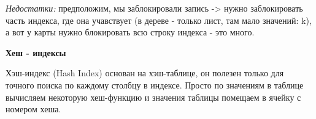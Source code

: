 \textit{Недостатки:} предположим, мы заблокировали запись -> нужно заблокировать часть индекса, где она учавствует (в дереве - только лист, там мало значений: k), а вот у карты нужно блокировать всю строку индекса - это много.


\textbf{Хеш - индексы} 

Хэш-индекс (Hash Index) основан на хэш-таблице, он полезен только для точного поиска по каждому столбцу в индексе. Просто по значениям в таблице вычисляем некоторую хеш-функцию и значения таблицы помещаем в ячейку с номером хеша. 

